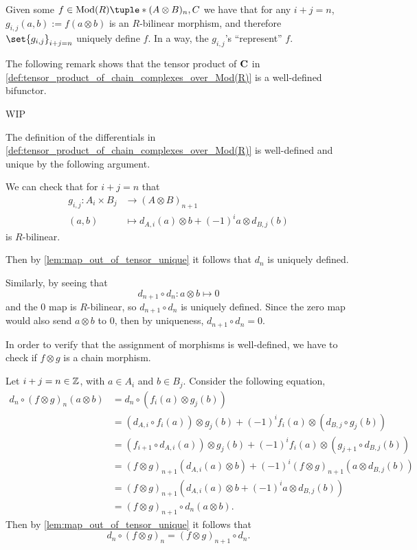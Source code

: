 Given some \( f \in \Mod(R)\tuple*{ (A \otimes B)_n, C } \) we have that for any \( i + j = n \), \( g_{i, j}(a, b) := f(a \otimes b) \) is an \( R \)-bilinear morphism, and therefore \( \set{g_{i, j}}_{i + j = n} \) uniquely define \( f \). In a way, the \( g_{i, j} \)'s ``represent'' \( f \).

The following remark shows that the tensor product of \( \operatorname{\mathbf{C}} \) in \autoref{def:tensor_product_of_chain_complexes_over_Mod(R)} is a well-defined bifunctor.

WIP

\begin{remark}
    \label{rem:c_tensor_bifunctor}
    The definition of the differentials in \autoref{def:tensor_product_of_chain_complexes_over_Mod(R)} is well-defined and unique by the following argument.

    We can check that for \( i + j = n \) that
    \begin{align*}
        g_{i, j}: A_i \times B_j &\to (A \otimes B)_{n + 1} \\
        (a, b) &\mapsto d_{A, i}(a) \otimes b + (-1)^i a \otimes d_{B, j}(b)
    \end{align*}
    is \( R \)-bilinear.

    Then by \autoref{lem:map_out_of_tensor_unique} it follows that \( d_n \) is uniquely defined.

    Similarly, by seeing that
    \[
        d_{n + 1} \circ d_n: a \otimes b \mapsto 0
    \]
    and the \( 0 \) map is \( R \)-bilinear, so \( d_{n + 1} \circ d_n \) is uniquely defined. Since the zero map would also send \( a \otimes b \) to \( 0 \), then by uniqueness, \( d_{n + 1} \circ d_n = 0 \).

    In order to verify that the assignment of morphisms is well-defined, we have to check if \( f \otimes g \) is a chain morphism.
    
    Let \( i + j = n \in {\mathbb{Z}} \), with \( a \in A_i \) and \( b \in B_j \). Consider the following equation,
    \begin{align*}
        d_n \circ (f \otimes g)_n (a \otimes b) &= d_n \circ (f_i(a) \otimes g_j(b)) \\
        &= (d_{A, i} \circ f_i(a)) \otimes g_j(b) + (-1)^i f_i(a) \otimes (d_{B, j} \circ g_j(b)) \\
        &= (f_{i + 1} \circ d_{A, i} (a)) \otimes g_j (b) + (-1)^i f_i(a) \otimes (g_{j + 1} \circ d_{B, j}(b)) \\
        &= (f \otimes g)_{n + 1} (d_{A, i}(a) \otimes b) + (-1)^i (f \otimes g)_{n + 1} (a \otimes d_{B, j}(b)) \\
        &= (f \otimes g)_{n + 1} (d_{A, i} (a) \otimes b + (-1)^i a \otimes d_{B, j} (b)) \\
        &= (f \otimes g)_{n + 1} \circ d_n (a \otimes b).
    \end{align*}
    Then by \autoref{lem:map_out_of_tensor_unique} it follows that
    \[
        d_n \circ (f \otimes g)_n = (f \otimes g)_{n + 1} \circ d_n.
    \]


\end{remark}
